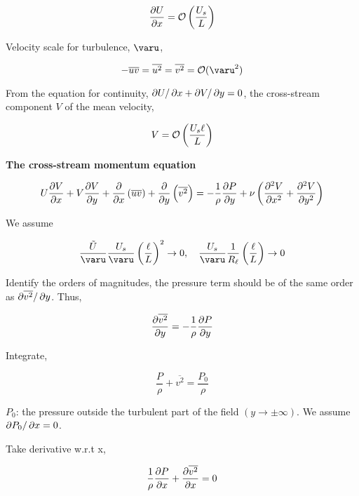\documentclass{article}
\begin{document}
\begin{equation*}
    \frac{\mathop{}\!\partial U}{\mathop{}\!\partial x}=\mathcal{O}\left(\frac{U_s}{L}\right)
\end{equation*}

Velocity scale for turbulence, $\varu$,

\begin{equation*}
    -\overline{uv}=\overline{u^2}=\overline{v^2}=\Order(\varu^2)
\end{equation*}

From the equation for continuity, $\mathop{}\!\partial U/\mathop{}\!\partial x+\mathop{}\!\partial V/\mathop{}\!\partial y=0$, the cross-stream component $V$ of the mean velocity,

\begin{equation*}
    V=\mathcal{O}\left(\frac{U_s\ell}{L}\right)
\end{equation*}

\textbf{The cross-stream momentum equation}

\begin{equation*}
    U\frac{\p V}{\p x}+V\frac{\p V}{\p y}+\frac{\p}{\p x}\left(\overline{uv}\right)+\frac{\p}{\p y}\left(\overline{v^2}\right)=-\frac{1}{\rho}\frac{\p P}{\p y}+\nu\left(\frac{\p^2 V}{\p x^2}+\frac{\p^2 V}{\p y^2}\right)
\end{equation*}

We assume

\begin{equation*}
    \frac{\tilde{U}}{\varu}\frac{U_s}{\varu}\left(\frac{\ell}{L}\right)^2\rightarrow0,\quad
    \frac{U_s}{\varu}\frac{1}{R_\ell}\left(\frac{\ell}{L}\right)\rightarrow0
\end{equation*}

Identify the orders of magnitudes, the pressure term should be of the same order as $\mathop{}\!\partial\overline{v^2}/\mathop{}\!\partial y$. Thus,

\begin{equation*}
    \frac{\mathop{}\!\partial \overline{v^2}}{\mathop{}\!\partial y}=-\frac{1}{\rho}\frac{\mathop{}\!\partial P}{\mathop{}\!\partial y}
\end{equation*}

Integrate,

\begin{equation*}
    \frac{P}{\rho}+\overline{v^2}=\frac{P_0}{\rho}
\end{equation*}

$P_0$: the pressure outside the turbulent part of the field $(y\rightarrow\pm\infty)$. We assume $\mathop{}\!\partial P_0/\mathop{}\!\partial x=0$.

Take derivative w.r.t x,

\begin{equation*}
    \frac{1}{\rho}\frac{\mathop{}\!\partial P}{\mathop{}\!\partial x}+\frac{\mathop{}\!\partial\overline{v^2}}{\mathop{}\!\partial x}=0
\end{equation*}
\end{document}
